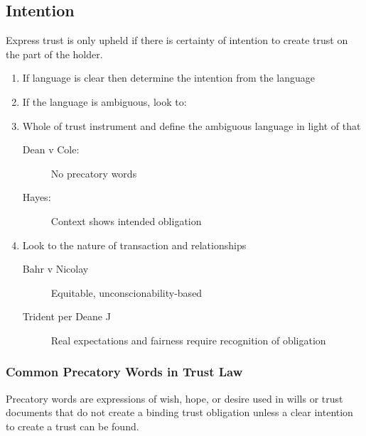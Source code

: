 \subsection*{Intention}
Express trust is only upheld if there is certainty of intention to create trust on the part of the holder.
\begin{enumerate}
    \item If language is clear then determine the intention from the language
    \item If the language is ambiguous, look to:
    \item Whole of trust instrument and define the ambiguous language in light of that 
        \begin{description}
            \item[Dean v Cole:]No precatory words 
            \item[Hayes:]Context shows intended obligation
        \end{description}
    \item Look to the nature of transaction and relationships 
        \begin{description}
            \item[Bahr v Nicolay] Equitable, unconscionability-based
            \item [Trident per Deane J]Real expectations and fairness require recognition of obligation
        \end{description}

\end{enumerate}

\subsubsection*{Common Precatory Words in Trust Law}
Precatory words are expressions of wish, hope, or desire used in wills or trust documents that do not create a binding trust obligation unless a clear intention to create a trust can be found.

\vspace{0.5cm}

